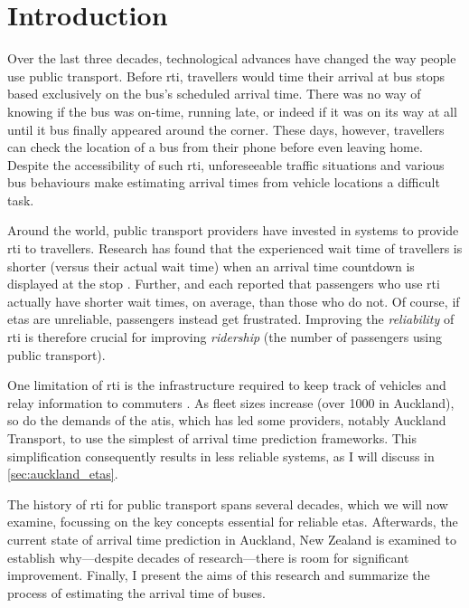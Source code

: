\glsresetall

\chapter{Introduction}
\label{cha:intro}


Over the last three decades, technological advances have changed the way people use public transport. Before \gls{rti}, travellers would time their arrival at bus stops based exclusively on the bus's scheduled arrival time. There was no way of knowing if the bus was on-time, running late, or indeed if it was on its way at all until it bus finally appeared around the corner. These days, however, travellers can check the location of a bus from their phone before even leaving home. Despite the accessibility of such \gls{rti}, unforeseeable traffic situations and various bus behaviours make
estimating arrival times from vehicle locations a difficult task.


Around the world, public transport providers have invested in systems to provide \gls{rti} to travellers. Research has found that the experienced wait time of travellers is shorter (versus their actual wait time) when an arrival time countdown is displayed at the stop \citep{TCRP_2003}. Further, \citet{Cats_2015} and \citet{Lu_2017} each reported that passengers who use \gls{rti} actually have shorter wait times, on average, than those who do not. Of course, if \glspl{eta} are unreliable, passengers instead get frustrated. Improving the \emph{reliability} of \gls{rti} is therefore crucial for improving \emph{ridership} (the number of passengers using public transport).


One limitation of \gls{rti} is the infrastructure required to keep track of vehicles and relay information to commuters \cite{TCRP_2003b}. As fleet sizes increase (over 1000 in Auckland), so do the demands of the \gls{atis}, which has led some providers, notably Auckland Transport, to use the simplest of arrival time prediction frameworks. This simplification consequently results in less reliable systems, as I will discuss in \cref{sec:auckland_etas}.


The history of \gls{rti} for public transport spans several decades, which we will now examine, focussing on the key concepts essential for reliable \glspl{eta}. Afterwards, the current state of arrival time prediction in Auckland, New Zealand is examined to establish why---despite decades of research---there is room for significant improvement. Finally, I present the aims of this research and summarize the process of estimating the arrival time of buses.



